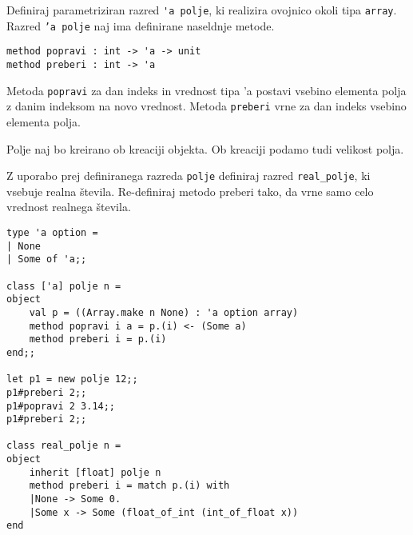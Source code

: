 \begin{ex}
Definiraj parametriziran razred \lstinline{'a polje}, ki realizira ovojnico okoli tipa \lstinline{array}. Razred \texttt{'a polje} naj ima definirane naseldnje metode.
\begin{lstlisting}
method popravi : int -> 'a -> unit
method preberi : int -> 'a 
\end{lstlisting}
Metoda \texttt{popravi} za dan indeks in vrednost tipa 'a postavi vsebino elementa polja z danim indeksom na novo vrednost. Metoda \texttt{preberi} vrne za dan indeks vsebino elementa polja. 

Polje naj bo kreirano ob kreaciji objekta. Ob kreaciji podamo tudi velikost polja.

Z uporabo prej definiranega razreda \lstinline{polje} definiraj razred \lstinline{real_polje}, ki vsebuje realna \v stevila. Re-definiraj metodo preberi tako, da vrne samo celo vrednost realnega \v stevila.

\begin{sol}

\begin{lstlisting}
type 'a option = 
| None
| Some of 'a;;

class ['a] polje n =
object
    val p = ((Array.make n None) : 'a option array)
    method popravi i a = p.(i) <- (Some a)
    method preberi i = p.(i)
end;;

let p1 = new polje 12;;
p1#preberi 2;;
p1#popravi 2 3.14;;
p1#preberi 2;;

class real_polje n = 
object
    inherit [float] polje n
    method preberi i = match p.(i) with
    |None -> Some 0.
    |Some x -> Some (float_of_int (int_of_float x))
end
\end{lstlisting}
\end{sol}



\end{ex}





